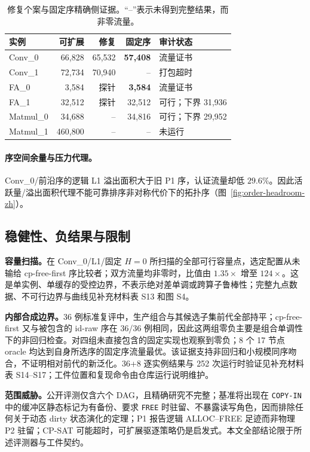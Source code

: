 \begin{table}[t]\centering\small
\caption{修复个案与固定序精确侧证据。“--”表示未得到完整结果，而非零流量。}
\label{tab:exact-zh}
\begin{tabular}{lrrrl}\toprule
实例 & 可扩展 & 修复 & 固定序 & 审计状态\\\midrule
Conv\_0 & 66,828 & 65,532 & \textbf{57,408} & 流量证书\\
Conv\_1 & 72,734 & 70,940 & -- & 打包超时\\
FA\_0 & 3,584 & 探针 & \textbf{3,584} & 流量证书\\
FA\_1 & 32,512 & 探针 & 32,512 & 可行；下界 31,936\\
Matmul\_0 & 34,688 & -- & 34,816 & 可行；下界 29,952\\
Matmul\_1 & 460,800 & -- & -- & 未运行\\\bottomrule
\end{tabular}\end{table}

\paragraph{序空间余量与压力代理。}Conv\_0/前沿序的逻辑 L1 溢出面积大于旧 P1 序，认证流量却低 $29.6\%$。因此活跃量/溢出面积代理不能可靠排序非对称代价下的拓扑序（图~\ref{fig:order-headroom-zh}）。

\subsection{稳健性、负结果与限制}
\textbf{容量扫描。}在 Conv\_0/L1/固定 $H=0$ 所扫描的全部可行容量点，选定配置从未输给 cp-free-first 序比较者；双方流量均非零时，比值由 $1.35\times$ 增至 $124\times$。这是单实例、单缓存的受控边界，不表示绝对差单调或跨算子鲁棒性；完整九点数据、不可行边界与曲线见补充材料表 S13 和图 S4。

\textbf{内部合成边界。}36 例标准复评中，生产组合与其候选子集前代全部持平；cp-free-first 又与被包含的 id-raw 序在 36/36 例相同，因此这两组零负主要是组合单调性下的非回归检查。对四组未直接包含的固定实现也观察到零负；8 个 17 节点 oracle 均达到自身所选序的固定序流量最优。该证据支持非回归和小规模同序吻合，不证明相对前代的新泛化。36+8 逐实例结果与 252 次运行时验证见补充材料表 S14--S17；工件位置和复现命令由仓库运行说明维护。

\textbf{范围威胁。}公开评测仅含六个 DAG，且精确研究不完整；基准将出现在 \texttt{COPY-IN} 中的缓冲区静态标记为有备份、要求 \texttt{FREE} 时驻留、不暴露读写角色，因而排除任何关于动态 dirty 状态演化的定理；P1 报告逻辑 ALLOC--FREE 足迹而非物理 P2 驻留；CP-SAT 可能超时，可扩展驱逐策略仍是启发式。本文全部结论限于所述评测器与工件契约。
